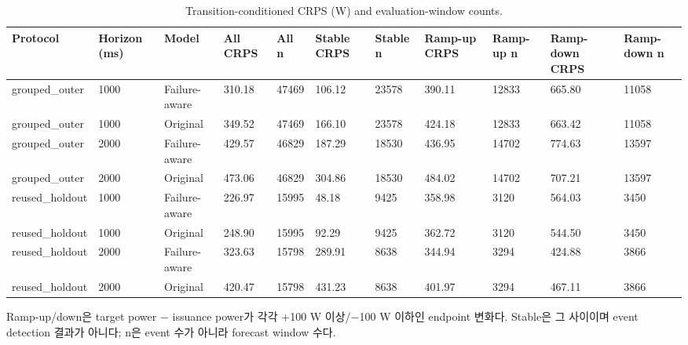 \begin{table}[t]
\centering
\caption{Transition-conditioned CRPS (W) and evaluation-window counts.}
\label{tab:a4_transition_conditioned}
\small
\begin{tabular}{lllllllllll}
\toprule
Protocol & Horizon (ms) & Model & All CRPS & All n & Stable CRPS & Stable n & Ramp-up CRPS & Ramp-up n & Ramp-down CRPS & Ramp-down n \\
\midrule
grouped\_outer & 1000 & Failure-aware & 310.18 & 47469 & 106.12 & 23578 & 390.11 & 12833 & 665.80 & 11058 \\
grouped\_outer & 1000 & Original & 349.52 & 47469 & 166.10 & 23578 & 424.18 & 12833 & 663.42 & 11058 \\
grouped\_outer & 2000 & Failure-aware & 429.57 & 46829 & 187.29 & 18530 & 436.95 & 14702 & 774.63 & 13597 \\
grouped\_outer & 2000 & Original & 473.06 & 46829 & 304.86 & 18530 & 484.02 & 14702 & 707.21 & 13597 \\
reused\_holdout & 1000 & Failure-aware & 226.97 & 15995 & 48.18 & 9425 & 358.98 & 3120 & 564.03 & 3450 \\
reused\_holdout & 1000 & Original & 248.90 & 15995 & 92.29 & 9425 & 362.72 & 3120 & 544.50 & 3450 \\
reused\_holdout & 2000 & Failure-aware & 323.63 & 15798 & 289.91 & 8638 & 344.94 & 3294 & 424.88 & 3866 \\
reused\_holdout & 2000 & Original & 420.47 & 15798 & 431.23 & 8638 & 401.97 & 3294 & 467.11 & 3866 \\
\bottomrule
\end{tabular}
\vspace{2pt}\par\footnotesize Ramp-up/down은 target power − issuance power가 각각 +100 W 이상/−100 W 이하인 endpoint 변화다. Stable은 그 사이이며 event detection 결과가 아니다; n은 event 수가 아니라 forecast window 수다.
\end{table}
